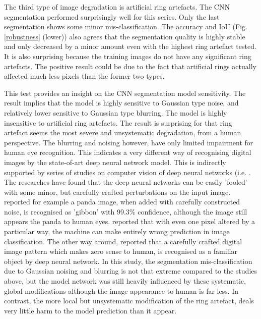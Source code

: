 \documentclass[draft,linenumbers]{agujournal2018}
\begin{document}
 The third type of image degradation is artificial ring artefacts. The CNN segmentation performed surprisingly well for this series. Only the last segmentation shows some minor mis-classification. The accuracy and IoU (Fig.\ref{robustness} (lower)) also agrees that the segmentation quality is highly stable and only decreased by a minor amount even with the highest ring artefact tested. It is also surprising because the training images do not have any significant ring artefacts. The positive result could be due to the fact that artificial rings actually affected much less pixels than the former two types.
 
 This test provides an insight on the CNN segmentation model sensitivity. The result implies that the model is highly sensitive to Gaussian type noise, and relatively lower sensitive to Gaussian type blurring. The model is highly insensitive to artificial ring artefacts. The result is surprising for that ring artefact seems the most severe and unsystematic degradation, from a human perspective. The blurring and noising however, have only limited impairment for human eye recognition. This indicates a very different way of recognising digital images by the state-of-art deep neural network model. This is indirectly supported by series of studies on computer vision of deep neural networks (i.e. \citet{nguyen2015deep, goodfellow2014explaining,su2019one}. The researches have found that the deep neural networks can be easily 'fooled' with some minor, but carefully crafted perturbations on the input image. \citet{goodfellow2014explaining} reported for example a panda image, when added with carefully constructed noise, is recognised as 'gibbon' with 99.3\% confidence, although the image still appears the panda to human eyes. \citet{su2019one} reported that with even one pixel altered by a particular way, the machine can make entirely wrong prediction in image classification. The other way around, \citet{nguyen2015deep} reported that a carefully crafted digital image pattern which makes zero sense to human, is recognised as a familiar object by deep neural network. In this study, the segmentation mis-classification due to Gaussian noising and blurring is not that extreme compared to the studies above, but the model network was still heavily influenced by these systematic, global modifications although the image appearance to human is far less. In contrast, the more local but unsystematic modification of the ring artefact, deals very little harm to the model prediction than it appear.
 
\end{document}
